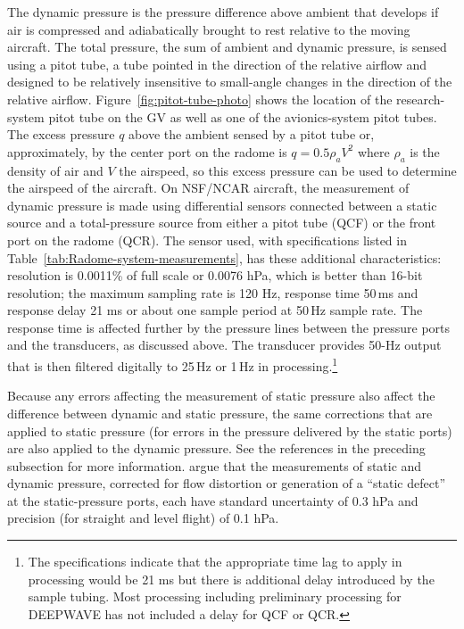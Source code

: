 \documentclass[12pt,twoside,english]{article}\usepackage[]{graphicx}\usepackage[]{color}
\let\OrgIndex\index
\renewcommand*{\index}[1]{\OrgIndex{#1}}
\begin{document}
The dynamic pressure is the pressure difference above ambient that develops if air is compressed and adiabatically brought to rest relative to the moving aircraft. The total pressure, the sum of ambient and dynamic pressure, is sensed using a pitot tube, a tube pointed in the direction of the relative airflow and designed to be relatively insensitive to small-angle changes in the direction of the relative airflow. Figure~\ref{fig:pitot-tube-photo} shows the location of the research-system pitot tube on the GV as well as one of the avionics-system pitot tubes. The excess pressure $q$ above the ambient sensed by a pitot tube or, approximately, by the center port on the radome is $q=0.5\rho_{a}V^{2}$ where $\rho_{a}$ is the density of air and $V$ the airspeed, so this excess pressure can be used to determine the airspeed of the aircraft. On NSF/NCAR aircraft, the measurement of dynamic pressure is made using differential sensors connected between a static source and a total-pressure source from either a pitot tube (QCF) or the front port on the radome (QCR). The sensor used, with specifications listed in Table~\ref{tab:Radome-system-measurements}, has these additional characteristics: resolution is 0.0011\% of full scale or 0.0076 hPa, which is better than 16-bit resolution; the maximum sampling rate is 120 Hz, response time 50\,ms and response delay 21 ms or about one sample period at 50\,Hz sample rate. The response time is affected further by the pressure lines between the pressure ports and the transducers, as discussed above. The transducer provides 50-Hz output that is then filtered digitally to 25\,Hz or 1\,Hz in processing.\footnote{The specifications indicate that the appropriate time lag to apply in processing would be 21 ms but there is additional delay introduced by the sample tubing. Most processing including preliminary processing for DEEPWAVE has not included a delay for QCF or QCR.} 

Because any errors affecting the measurement of static pressure also affect the difference between dynamic and static pressure, the same corrections that are applied to static pressure (for errors in the pressure delivered by the static ports) are also applied to the dynamic pressure. See the references in the preceding subsection for more information. \citet{CooperEtAl2014} argue that the measurements of static and dynamic pressure, corrected for flow distortion or generation of a ``static defect'' at the static-pressure ports, each have standard uncertainty of 0.3 hPa and precision (for straight and level flight) of 0.1 hPa. 
\end{document}
